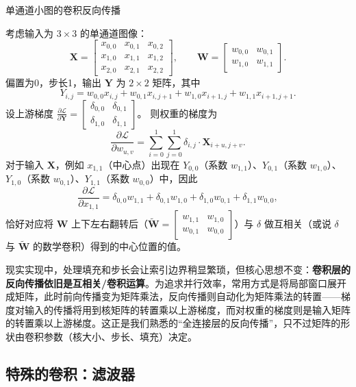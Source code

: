 \begin{example}{单通道小图的卷积反向传播}{}

考虑输入为 $3\times3$ 的单通道图像：
\[
\mathbf{X} = \begin{bmatrix}
x_{0,0} & x_{0,1} & x_{0,2} \\
x_{1,0} & x_{1,1} & x_{1,2} \\
x_{2,0} & x_{2,1} & x_{2,2}
\end{bmatrix}, \qquad
\mathbf{W} = \begin{bmatrix}
w_{0,0} & w_{0,1} \\
w_{1,0} & w_{1,1}
\end{bmatrix}.
\]
偏置为0，步长1，输出 $\mathbf{Y}$ 为 $2\times2$ 矩阵，其中
\[
Y_{i,j} = w_{0,0}x_{i,j} + w_{0,1}x_{i,j+1} + w_{1,0}x_{i+1,j} + w_{1,1}x_{i+1,j+1}.
\]
设上游梯度 $\frac{\partial\mathcal{L}}{\partial \mathbf{Y}} = \begin{bmatrix} \delta_{0,0} & \delta_{0,1} \\ \delta_{1,0} & \delta_{1,1} \end{bmatrix}$。
则权重的梯度为
\[
\frac{\partial\mathcal{L}}{\partial w_{u,v}} = \sum_{i=0}^1\sum_{j=0}^1 \delta_{i,j} \cdot \mathbf{X}_{i+u, j+v}.
\]
对于输入 $\mathbf{X}$，例如 $x_{1,1}$（中心点）出现在 $Y_{0,0}$（系数 $w_{1,1}$）、$Y_{0,1}$（系数 $w_{1,0}$）、$Y_{1,0}$（系数 $w_{0,1}$）、$Y_{1,1}$（系数 $w_{0,0}$）中，因此
\[
\frac{\partial\mathcal{L}}{\partial x_{1,1}} = \delta_{0,0}w_{1,1} + \delta_{0,1}w_{1,0} + \delta_{1,0}w_{0,1} + \delta_{1,1}w_{0,0},
\]
恰好对应将 $\mathbf{W}$ 上下左右翻转后（$\widetilde{\mathbf{W}} = \begin{bmatrix}w_{1,1}&w_{1,0}\\ w_{0,1}&w_{0,0}\end{bmatrix}$）与 $\delta$ 做互相关（或说 $\delta$ 与 $\widetilde{\mathbf{W}}$ 的数学卷积）得到的中心位置的值。
\end{example}

现实实现中，处理填充和步长会让索引边界稍显繁琐，但核心思想不变：\textbf{卷积层的反向传播依旧是互相关/卷积运算}。为追求并行效率，常用方式是将局部窗口展开成矩阵，此时前向传播变为矩阵乘法，反向传播则自动化为矩阵乘法的转置——梯度对输入的传播将用到核矩阵的转置乘以上游梯度，而对权重的梯度则是输入矩阵的转置乘以上游梯度。这正是我们熟悉的“全连接层的反向传播”，只不过矩阵的形状由卷积参数（核大小、步长、填充）决定。

\subsection{特殊的卷积：滤波器}

